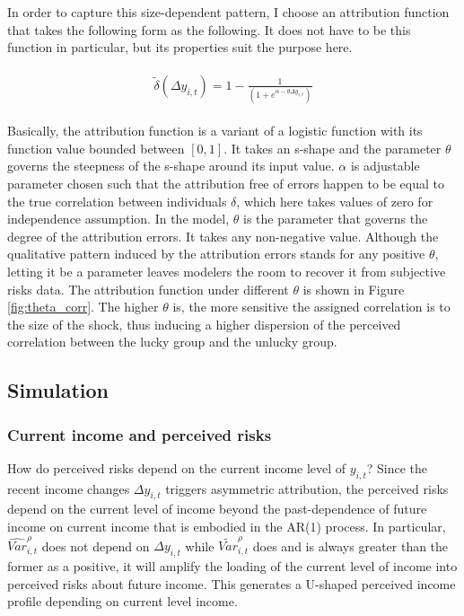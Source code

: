 \documentclass[12pt,notitlepage,onecolumn,aps,pra]{article}
\begin{document}
In order to capture this size-dependent pattern, I choose an attribution
function that takes the following form as the following. It does not
have to be this function in particular, but its properties suit the
purpose here.

\begin{eqnarray}
\begin{split}
\tilde \delta(\Delta y_{i,t}) = 1- \frac{1}{(1+e^{\alpha-\theta \Delta y_{i,t}})}
\end{split}
\end{eqnarray}

Basically, the attribution function is a variant of a logistic function
with its function value bounded between \([0,1]\). It takes an s-shape
and the parameter \(\theta\) governs the steepness of the s-shape around
its input value. \(\alpha\) is adjustable parameter chosen such that the
attribution free of errors happen to be equal to the true correlation
between individuals \(\delta\), which here takes values of zero for
independence assumption. In the model, \(\theta\) is the parameter that
governs the degree of the attribution errors. It takes any non-negative
value. Although the qualitative pattern induced by the attribution
errors stands for any positive \(\theta\), letting it be a parameter
leaves modelers the room to recover it from subjective risks data. The
attribution function under different \(\theta\) is shown in Figure
\ref{fig:theta_corr}. The higher \(\theta\) is, the more sensitive the
assigned correlation is to the size of the shock, thus inducing a higher
dispersion of the perceived correlation between the lucky group and the
unlucky group.



    \hypertarget{simulation}{%
\subsection{Simulation}\label{simulation}}

\hypertarget{current-income-and-perceived-risks}{%
\subsubsection{Current income and perceived
risks}\label{current-income-and-perceived-risks}}

How do perceived risks depend on the current income level of
\(y_{i,t}\)? Since the recent income changes \(\Delta y_{i,t}\) triggers
asymmetric attribution, the perceived risks depend on the current level
of income beyond the past-dependence of future income on current income
that is embodied in the AR(1) process. In particular,
\(\widehat{Var}^\rho_{i,t}\) does not depend on \(\Delta y_{i,t}\) while
\(\tilde{Var}^\rho_{i,t}\) does and is always greater than the former as
a positive, it will amplify the loading of the current level of income
into perceived risks about future income. This generates a U-shaped
perceived income profile depending on current level income.
\end{document}
